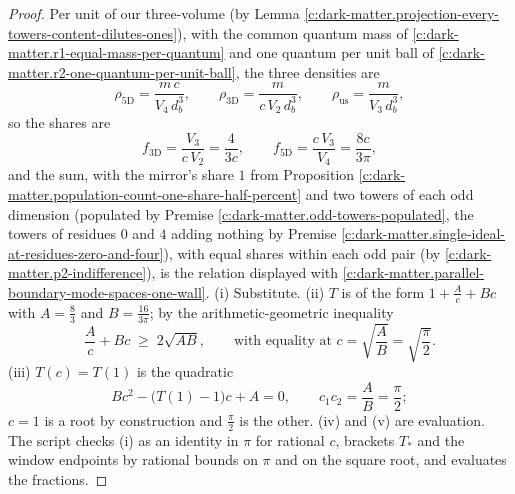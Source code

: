 \documentclass[11pt]{article}
\theoremstyle{definition}
\theoremstyle{plain}
\begin{document}
\begin{proof}
Per unit of our three-volume (by Lemma \ref{c:dark-matter.projection-every-towers-content-dilutes-ones}), with the common quantum mass of \ref{c:dark-matter.r1-equal-mass-per-quantum} and one quantum per unit ball of \ref{c:dark-matter.r2-one-quantum-per-unit-ball}, the three densities are
\[
\rho_{5\mathrm{D}} = \frac{m\,c}{V_{4}\,d_{b}^{3}}, \qquad
\rho_{3\mathrm{D}} = \frac{m}{c\,V_{2}\,d_{b}^{3}}, \qquad
\rho_{\mathrm{us}} = \frac{m}{V_{3}\,d_{b}^{3}},
\]
so the shares are
\[
f_{3\mathrm{D}} = \frac{V_{3}}{c\,V_{2}} = \frac{4}{3c}, \qquad f_{5\mathrm{D}} = \frac{c\,V_{3}}{V_{4}} = \frac{8c}{3\pi},
\]
and the sum, with the mirror's share $1$ from Proposition \ref{c:dark-matter.population-count-one-share-half-percent} and two towers of each odd dimension (populated by Premise \ref{c:dark-matter.odd-towers-populated}, the towers of residues $0$ and $4$ adding nothing by Premise \ref{c:dark-matter.single-ideal-at-residues-zero-and-four}), with equal shares within each odd pair (by \ref{c:dark-matter.p2-indifference}), is the relation displayed with \ref{c:dark-matter.parallel-boundary-mode-spaces-one-wall}. (i) Substitute. (ii) $T$ is of the form $1 + \frac{A}{c} + Bc$ with $A = \frac{8}{3}$ and $B = \frac{16}{3\pi}$; by the arithmetic-geometric inequality
\[
\frac{A}{c} + Bc \;\geq\; 2\sqrt{AB}, \qquad \text{with equality at } c = \sqrt{\frac{A}{B}} = \sqrt{\frac{\pi}{2}} .
\]
(iii) $T(c) = T(1)$ is the quadratic
\[
Bc^{2} - \bigl(T(1) - 1\bigr)c + A = 0, \qquad c_{1}c_{2} = \frac{A}{B} = \frac{\pi}{2};
\]
$c = 1$ is a root by construction and $\frac{\pi}{2}$ is the other. (iv) and (v) are evaluation. The script checks (i) as an identity in $\pi$ for rational $c$, brackets $T_{\ast}$ and the window endpoints by rational bounds on $\pi$ and on the square root, and evaluates the fractions.

\end{proof}
\end{document}
